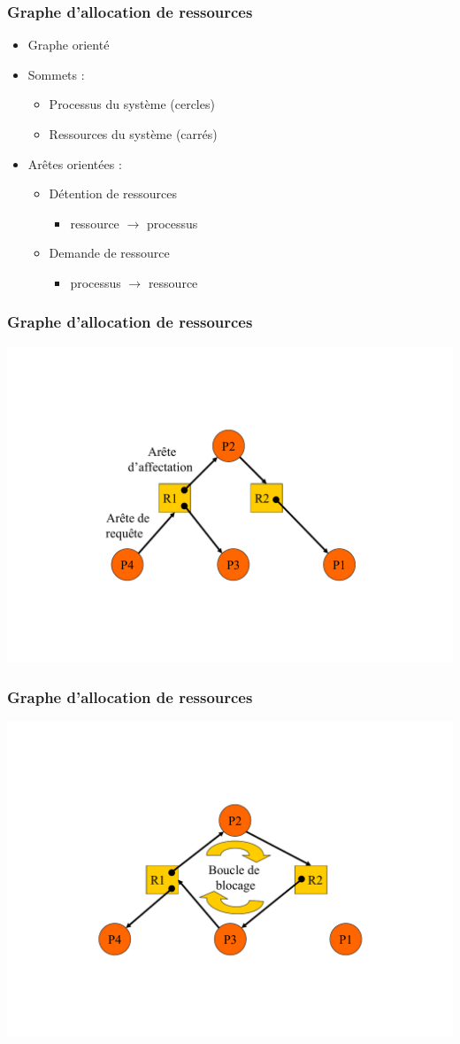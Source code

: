\begin{frame}
\frametitle{Graphe d’allocation de ressources}
\begin{itemize}
\item <1-> Graphe orienté
\item <2-> Sommets :
\begin{itemize}
\item Processus du système (cercles)
\item Ressources du système (carrés)
\end{itemize}
\item <3-> Arêtes orientées :
\begin{itemize}
\item Détention de ressources
\begin{itemize}
\item ressource $\to$ processus
\end{itemize}
\item Demande de ressource
\begin{itemize}
\item processus $\to$ ressource
\end{itemize}
\end{itemize}
\end{itemize}
\end{frame}

\begin{frame}
\frametitle{Graphe d’allocation de ressources}
\includegraphics[width=.8\textwidth]{../illustration/graphe_alloc_ressource.pdf}
\end{frame}

\begin{frame}
\frametitle{Graphe d’allocation de ressources}
\includegraphics[width=.8\textwidth]{../illustration/graphe_alloc_ressource_ib.pdf}
\end{frame}

